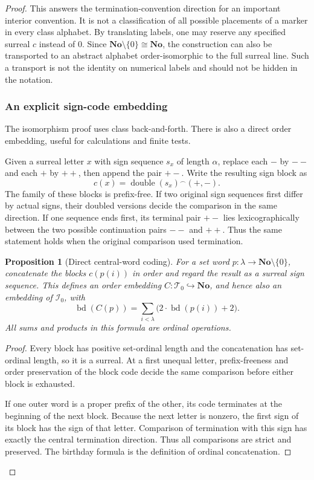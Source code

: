 \documentclass[11pt]{article}
\newtheorem{proposition}[proposition]{Proposition}
\theoremstyle{definition}
\theoremstyle{remark}
\newcommand{\No}{\mathbf{No}}
\newcommand{\I}{\mathcal I}
\newcommand{\WordsAll}{\mathcal T}
\newcommand{\bd}{\operatorname{bd}}
\newcommand{\emb}{\hookrightarrow}
\newcommand{\cat}{\mathbin{{}^\frown}}
\begin{document}
\begin{proof}
This answers the termination-convention direction for an important
interior convention. It is not a classification of all possible
placements of a marker in every class alphabet. By translating labels,
one may reserve any specified surreal $c$ instead of $0$. Since
$\No\setminus\{0\}\cong\No$, the construction can also be transported
to an abstract alphabet order-isomorphic to the full surreal line.
Such a transport is not the identity on numerical labels and should
not be hidden in the notation.

\subsubsection{An explicit sign-code embedding}

The isomorphism proof uses class back-and-forth. There is also a direct
order embedding, useful for calculations and finite tests.

Given a surreal letter $x$ with sign sequence $s_x$ of length $\alpha$,
replace each $-$ by $--$ and each $+$ by $++$, then append the pair
$+-$. Write the resulting sign block as
\[
             c(x)=\operatorname{double}(s_x)\cat(+,-).
\]
The family of these blocks is prefix-free. If two original sign
sequences first differ by actual signs, their doubled versions decide
the comparison in the same direction. If one sequence ends first,
its terminal pair $+-$ lies lexicographically between the two possible
continuation pairs $--$ and $++$. Thus the same statement holds when
the original comparison used termination.

\begin{proposition}[Direct central-word coding]\label{swo:fs:prop:centralcode}
For a set word $p:\lambda\to\No\setminus\{0\}$, concatenate the
blocks $c(p(i))$ in order and regard the result as a surreal sign
sequence. This defines an order embedding $C:\WordsAll_0\emb\No$, and
hence also an embedding of $\I_0$, with
\[
          \bd(C(p))=
          \sum_{i<\lambda}\bigl(2\cdot\bd(p(i))+2\bigr).
\]
All sums and products in this formula are ordinal operations.
\end{proposition}
\begin{proof}
Every block has positive set-ordinal length and the concatenation has
set-ordinal length, so it is a surreal. At a first unequal letter,
prefix-freeness and order preservation of the block code decide the
same comparison before either block is exhausted.

If one outer word is a proper prefix of the other, its code terminates
at the beginning of the next block. Because the next letter is
nonzero, the first sign of its block has the sign of that letter.
Comparison of termination with this sign has exactly the central
termination direction. Thus all comparisons are strict and preserved.
The birthday formula is the definition of ordinal concatenation.
\end{proof}


\end{proof}
\end{document}
